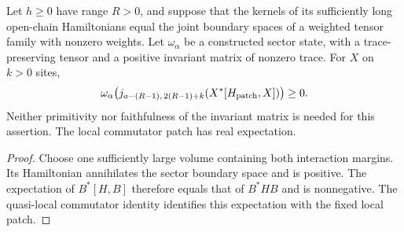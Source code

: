 \begin{lemma}
    \label{thm:eventual_kernel_sector_commutator_positive}
    \leanok
    Let $h\geq0$ have range $R>0$, and suppose that the kernels of its
    sufficiently long open-chain Hamiltonians equal the joint boundary spaces
    of a weighted tensor family with nonzero weights. Let $\omega_\alpha$ be
    a constructed sector state, with a trace-preserving tensor and a positive
    invariant matrix of nonzero trace. For $X$ on $k>0$ sites,
    \begin{align}
        \omega_\alpha\bigl(j_{a-(R-1),\,2(R-1)+k}
        (X^*[H_{\mathrm{patch}},X])\bigr)\geq0.
        \notag
    \end{align}
    Neither primitivity nor faithfulness of the invariant matrix is needed
    for this assertion. The local commutator patch has real expectation.
\end{lemma}
\begin{proof}\leanok
    Choose one sufficiently large volume containing both interaction
    margins. Its Hamiltonian annihilates the sector boundary space and is
    positive. The expectation of $B^*[H,B]$ therefore equals that of
    $B^*HB$ and is nonnegative. The quasi-local commutator identity identifies
    this expectation with the fixed local patch.
\end{proof}

